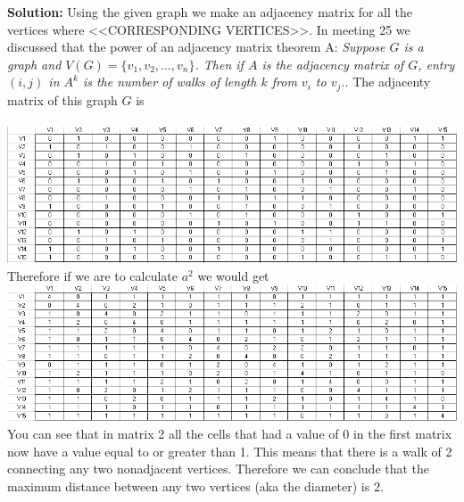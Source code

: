 \documentclass[10pt,a4paper]{report}
\begin{document}
		\noindent\textbf{Solution: }Using the given graph we make an adjacency matrix for all the vertices where <<CORRESPONDING VERTICES>>.  In meeting 25 we discussed that the power of an adjacency matrix theorem A: \emph{Suppose $G$ is a graph and $V(G) = \{v_{1}, v_{2}, ..., v_{n}\}$.  Then if $A$ is the adjacency matrix of $G$, entry $(i, j)$ in $A^{k}$ is the number of walks of length $k$ from $v_{i}$ to $v_{j}$.}.  The adjacenty matrix of this graph $G$ is  \\\\
		\includegraphics[scale=.64]{Math3310_Prob6.PNG} \\
		
		\noindent Therefore if we are to calculate $a^{2}$ we would get\\
		
		\noindent\includegraphics[scale=.64]{Math3310_Prob6-1.PNG}\\
		
		\noindent You can see that in matrix 2 all the cells that had a value of 0 in the first matrix now have a value equal to or greater than 1.  This means that there is a walk of 2 connecting any two nonadjacent vertices.  Therefore we can conclude that the maximum distance between any two vertices (aka the diameter) is 2.
		
\end{document}
